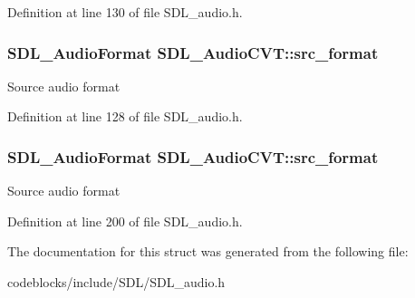 Definition at line 130 of file S\+D\+L\+\_\+audio.\+h.

\hypertarget{structSDL__AudioCVT_a6ae81231e017105e6d5e745a51732e16}{
\subsubsection[{src\+\_\+format}]{\setlength{\rightskip}{0pt plus 5cm}S\+D\+L\+\_\+\+Audio\+Format S\+D\+L\+\_\+\+Audio\+C\+V\+T\+::src\+\_\+format}}\label{structSDL__AudioCVT_a6ae81231e017105e6d5e745a51732e16}
Source audio format 

Definition at line 128 of file S\+D\+L\+\_\+audio.\+h.

\hypertarget{structSDL__AudioCVT_a6ae81231e017105e6d5e745a51732e16}{
\subsubsection[{src\+\_\+format}]{\setlength{\rightskip}{0pt plus 5cm}S\+D\+L\+\_\+\+Audio\+Format S\+D\+L\+\_\+\+Audio\+C\+V\+T\+::src\+\_\+format}}\label{structSDL__AudioCVT_a6ae81231e017105e6d5e745a51732e16}
Source audio format 

Definition at line 200 of file S\+D\+L\+\_\+audio.\+h.



The documentation for this struct was generated from the following file\+:\begin{DoxyCompactItemize}
\item 
codeblocks/include/\+S\+D\+L/S\+D\+L\+\_\+audio.\+h\end{DoxyCompactItemize}
